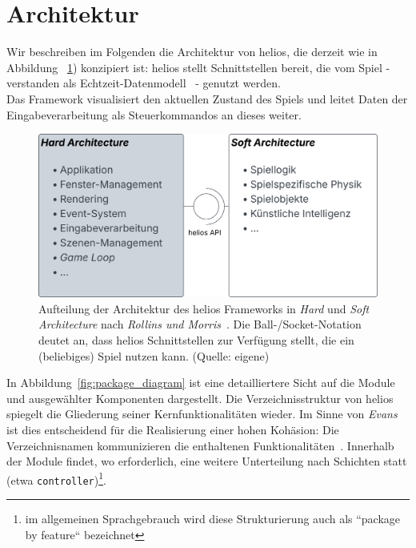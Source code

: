 \section{Architektur}
Wir beschreiben im Folgenden die Architektur von helios, die derzeit wie in Abbildung ~\ref{fig:hardarchitecture}) konzipiert ist: helios stellt Schnittstellen bereit, die vom Spiel - verstanden als Echtzeit-Datenmodell~\cite[525]{Gre19} - genutzt werden.\\
Das Framework visualisiert den aktuellen Zustand des Spiels und leitet Daten der Eingabeverarbeitung als Steuerkommandos an dieses weiter.\\

\begin{figure}[!h]
    \centering
    \includegraphics[width=1\columnwidth]{img/hardarchitecture.svg}
    \caption{Aufteilung der Architektur des helios Frameworks in \textit{Hard} und \textit{Soft Architecture} nach \textit{Rollins und Morris}~\cite[612 ff.]{RM04}. Die Ball-/Socket-Notation deutet an, dass helios Schnittstellen zur Verfügung stellt, die ein (beliebiges) Spiel nutzen kann. (Quelle: eigene)}
    \label{fig:hardarchitecture}
\end{figure}

In Abbildung~\ref{fig:package_diagram} ist eine detailliertere Sicht auf die Module und ausgewählter Komponenten dargestellt.
Die Verzeichnisstruktur von helios spiegelt die Gliederung seiner Kernfunktionalitäten wieder.
Im Sinne von \textit{Evans} ist dies entscheidend für die Realisierung einer hohen Kohäsion: Die Verzeichnisnamen kommunizieren die enthaltenen Funktionalitäten~\cite[180 f.]{Eva03}.
Innerhalb der Module findet, wo erforderlich, eine weitere Unterteilung nach Schichten statt (etwa \texttt{controller})\footnote{
im allgemeinen Sprachgebrauch wird diese Strukturierung auch als ``package by feature`` bezeichnet
}.\\


